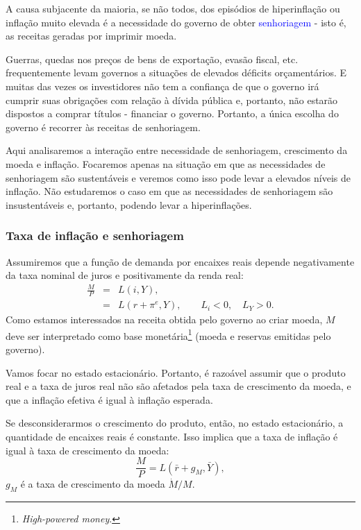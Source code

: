 \documentclass[preprintnumbers,nofootinbib,amsmath,amssymb,12pt]{article}
\begin{document}
A causa subjacente da maioria, se não todos, dos episódios de hiperinflação  ou inflação muito elevada é a necessidade do governo de obter \textcolor{blue}{senhoriagem} - isto é, as receitas geradas por imprimir moeda.

Guerras, quedas nos preços de bens de exportação, evasão fiscal, etc. frequentemente levam governos a situações de elevados déficits orçamentários. E muitas das vezes os investidores não tem a confiança de que o governo irá cumprir suas obrigações com relação à dívida pública e, portanto, não estarão dispostos a comprar títulos - financiar o governo. Portanto, a única escolha do governo é recorrer às receitas de senhoriagem.

Aqui analisaremos a interação entre necessidade de senhoriagem, crescimento da moeda e inflação. Focaremos apenas na situação em que as necessidades de senhoriagem são sustentáveis e veremos como isso pode levar a elevados níveis de inflação. Não estudaremos o caso em que as necessidades de senhoriagem são insustentáveis e, portanto, podendo levar a hiperinflações.

\subsubsection{Taxa de inflação e senhoriagem}

Assumiremos que a função de demanda por encaixes reais depende negativamente da taxa nominal de juros e positivamente da renda real:
\begin{eqnarray}
\frac{M}{P} &=& L(i, Y), \label{eq29} \\
&=& L(r + \pi^e, Y), \qquad L_i < 0, \quad L_Y>0. \nonumber
\end{eqnarray}
Como estamos interessados na receita obtida pelo governo ao criar moeda, $M$ deve ser interpretado como base monetária\footnote{\emph{High-powered money}.} (moeda e reservas emitidas pelo governo).

Vamos focar no estado estacionário. Portanto, é razoável assumir que o produto real e a taxa de juros real não são afetados pela taxa de crescimento da moeda, e que a inflação efetiva é igual à inflação esperada.

Se desconsiderarmos o crescimento do produto, então, no estado estacionário, a quantidade de encaixes reais é constante. Isso implica que a taxa de inflação é igual à taxa de crescimento da moeda:
\begin{equation}
    \frac{M}{P} = L(\bar{r} + g_M, \bar{Y}),
    \label{eq30}
\end{equation}
$g_M$ é a taxa de crescimento da moeda $\dot{M}/M$.
\end{document}
